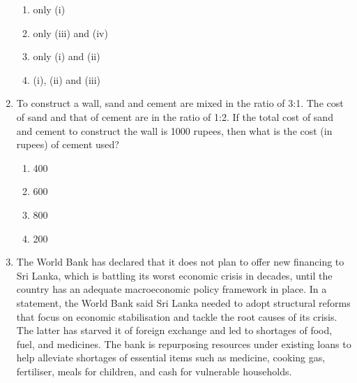 \documentclass[article]{IEEEtran}
\numberwithin{figure}{enumi}
\begin{document}
\begin{enumerate}
  \begin{enumerate}
    \item only (i)
    \item only (iii) and (iv)
    \item only (i) and (ii)
    \item (i), (ii) and (iii)
  \end{enumerate}

\item To construct a wall, sand and cement are mixed in the ratio of 3:1. The cost of sand and that of cement are in the ratio of 1:2. If the total cost of sand and cement to construct the wall is 1000 rupees, then what is the cost (in rupees) of cement used?
  \begin{enumerate}
    \item 400
    \item 600
    \item 800
    \item 200
  \end{enumerate}
\item The World Bank has declared that it does not plan to offer new financing to Sri
Lanka, which is battling its worst economic crisis in decades, until the country has
an adequate macroeconomic policy framework in place. In a statement, the World
Bank said Sri Lanka needed to adopt structural reforms that focus on economic
stabilisation and tackle the root causes of its crisis. The latter has starved it of
foreign exchange and led to shortages of food, fuel, and medicines. The bank is
repurposing resources under existing loans to help alleviate shortages of essential
items such as medicine, cooking gas, fertiliser, meals for children, and cash for
vulnerable households.\\


\end{enumerate}
\end{document}
